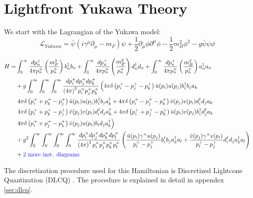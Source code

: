 \section{Lightfront Yukawa Theory}
\label{sec:yukawa-theory}
We start with the Lagrangian of the Yukawa model:
\begin{equation}
    \label{eq:yukawa-lagrangian}
    \mathcal{L}_{Yukawa} = \bar \psi \left(i\gamma^\mu \partial_\mu - m_F \right)\psi + \frac{1}{2}\partial_\mu \phi \partial^\mu \phi - \frac{1}{2}m_B^2\phi^2 - g\bar \psi \psi \phi
\end{equation}

\begin{align}
    \label{eq:yukawa-hamiltonian}
    H = & \int_0^\infty \frac{dp_n^+}{4\pi p_n^+}\left(\frac{m_F^2}{p_n^+}\right)b_n^\dagger b_n + \int_0^\infty \frac{dp_n^+}{4\pi p_n^+}\left(\frac{m_{\bar{F}}^2}{p_n^+}\right)d_n^\dagger d_n + \int_0^\infty \frac{dp_n^+}{4\pi p_n^+}\left(\frac{m_B^2}{p_n^+} \right)a_n^\dagger a_n\\ \nonumber
    & +g \int_0^\infty\int_0^\infty\int_0^\infty \frac{dp_i^+dp_j^+dp_k^+}{\left(4\pi \right)^3 p_i^+ p_j^+ p_k^+}\left(4\pi \delta\left(p_i^+ - p_j^+ - p_k^+ \right) \bar u(p_i) u(p_j)b_i^\dagger b_j a_k \right.\\ \nonumber
    &\left. 4\pi \delta\left(p_i^+ + p_k^+- p_j^+  \right) \bar u(p_i) u(p_j)b_i^\dagger b_j a_k^\dagger + 4\pi \delta\left(p_i^+ - p_j^+ - p_k^+ \right) \bar v(p_j) v(p_i)d_i^\dagger d_j a_k \right. \\ \nonumber
    &\left.  4\pi \delta\left(p_i^+ + p_k^+ - p_j^+ \right) \bar v(p_j) v(p_i)d_i^\dagger d_j a_k^\dagger + 4\pi \delta\left(p_i^+ + p_j^+ - p_k^+ \right) \bar u(p_i) v(p_j)b_i^\dagger d_j^\dagger a_k \right. \\ \nonumber
    & \left.  4\pi \delta\left(p_i^+ + p_j^+ - p_k^+ \right) \bar v(p_j) u(p_i)b_i d_j a_k^\dagger\right)\\ \nonumber
    & +g^2 \int_0^\infty\int_0^\infty\int_0^\infty \int_0^\infty\frac{dp_i^+dp_j^+dp_k^+ dp_l^+}{\left(4\pi \right)^4 p_i^+ p_j^+ p_k^+p_l^+} \left(\frac{\bar u(p_i) \gamma^+ u(p_j)}{p_l^+ - p_j^+}b_i^\dagger b_j a_k^\dagger a_l + \frac{\bar v(p_j) \gamma^+ v(p_i)}{p_l^+ - p_j^+}d_i^\dagger d_j a_k^\dagger a_l \right)\\ \nonumber
    & + \text{\textcolor{blue}{2 more inst. diagrams}}
\end{align}

The discretization procedure used for this Hamiltonian is Discretized Lightcone Quantization (DLCQ) \cite{}. 
The procedure is explained in detail in appendex \ref{sec:dlcq}.
